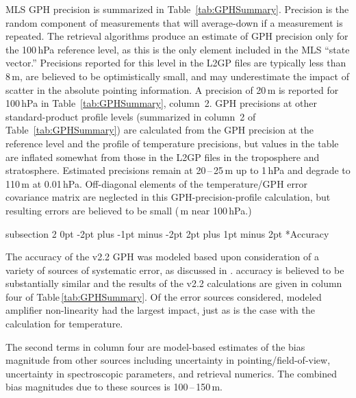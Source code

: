 \documentclass[11pt,draft]{report}
\makeatletter
\renewcommand{\subsection}{\@startsection%
  {subsection}%
  {2}%
  {0pt}%
  {-2pt plus -1pt minus -2pt}%
  {2pt plus 1pt minus 2pt}%
  {\large\sffamily\fontseries{sb}\selectfont\flushleft\color{SectionColor}\figureversion{tabular}}}%
\makeatother
\begin{document}
MLS \thisv GPH precision is summarized in Table~\ref{tab:GPHSummary}.
Precision is the random component of measurements that will average-down
if a measurement is repeated.  The retrieval algorithms produce an
estimate of GPH precision only for the 100\,hPa reference level, as this
is the only element included in the MLS ``state vector.''  Precisions
reported for this level in the L2GP files are typically less than 8\,m,
are believed to be optimistically small, and may underestimate the
impact of scatter in the absolute pointing information.  A precision of
20\,m is reported for 100\,hPa in Table~\ref{tab:GPHSummary}, column~2.
GPH precisions at other standard-product profile levels (summarized in
column~2 of Table~\ref{tab:GPHSummary}) are calculated from the GPH
precision at the reference level and the profile of temperature
precisions, but values in the table are inflated somewhat from those in
the L2GP files in the troposphere and stratosphere. Estimated precisions
remain at 20\,--\,25\,m up to 1\,hPa and degrade to 110\,m at 0.01\,hPa.
Off-diagonal elements of the temperature/GPH error covariance matrix are
neglected in this GPH-precision-profile calculation, but resulting
errors are believed to be small (\,m near 100\,hPa.)

\subsection*{Accuracy}

The accuracy of the v2.2 GPH was modeled based upon consideration of a
variety of sources of systematic error, as discussed in
\citet{SchwartzEtal08}. \thisv accuracy is believed to be substantially
similar and the results of the v2.2 calculations are given in column
four of Table\,\ref{tab:GPHSummary}. Of the error sources considered,
modeled amplifier non-linearity had the largest impact, just as is the
case with the calculation for temperature.

The second terms in column four are model-based estimates of the bias
magnitude from other sources including uncertainty in
pointing/field-of-view, uncertainty in spectroscopic parameters, and
retrieval numerics.  The combined bias magnitudes due to these sources
is 100\,--\,150\,m.
\end{document}

